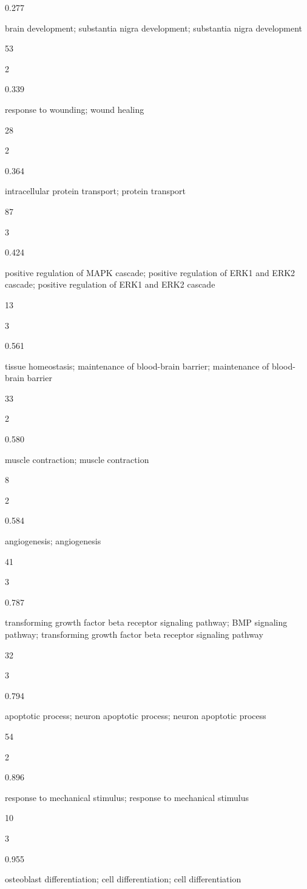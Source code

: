 \documentclass[
  letterpaper,
  DIV=11,
  numbers=noendperiod,
  openany,
  oneside]{scrreprt}
\begin{document}
0.277

brain development; substantia nigra development; substantia nigra
development

53

2

0.339

response to wounding; wound healing

28

2

0.364

intracellular protein transport; protein transport

87

3

0.424

positive regulation of MAPK cascade; positive regulation of ERK1 and
ERK2 cascade; positive regulation of ERK1 and ERK2 cascade

13

3

0.561

tissue homeostasis; maintenance of blood-brain barrier; maintenance of
blood-brain barrier

33

2

0.580

muscle contraction; muscle contraction

8

2

0.584

angiogenesis; angiogenesis

41

3

0.787

transforming growth factor beta receptor signaling pathway; BMP
signaling pathway; transforming growth factor beta receptor signaling
pathway

32

3

0.794

apoptotic process; neuron apoptotic process; neuron apoptotic process

54

2

0.896

response to mechanical stimulus; response to mechanical stimulus

10

3

0.955

osteoblast differentiation; cell differentiation; cell differentiation
\end{document}
